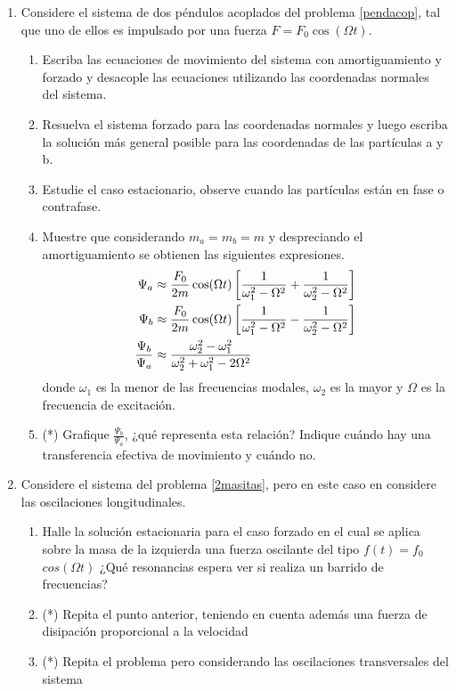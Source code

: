 \documentclass[11pt,spanish,a4paper]{article}
\begin{document}
\begin{enumerate}
\item Considere el sistema de dos péndulos acoplados del problema \ref{pendacop}, tal que uno de ellos es impulsado por una fuerza $F= F_0 \cos(\Omega t)$.  
\begin{enumerate}
	\item Escriba las ecuaciones de movimiento del sistema con amortiguamiento y forzado y desacople las ecuaciones utilizando las coordenadas normales del sistema.
	\item Resuelva el sistema forzado para las coordenadas normales y luego escriba la solución más general posible para las coordenadas de las partículas a y b.
	\item Estudie el caso estacionario, observe cuando las partículas están en fase o contrafase.
	\item Muestre que considerando $m_a= m_b= m$ y despreciando el amortiguamiento se obtienen las siguientes expresiones.
		\begin{align}
			\Psi_{a} &\approx \frac{F_{0}}{2m}\cos(\Omega t)\left[\frac{1}{\omega_{1}^{2}-\Omega^{2}} + \frac{1}{\omega_{2}^{2}-\Omega^{2}}\right] \notag \\
			\Psi_{b} &\approx \frac{F_{0}}{2m}\cos(\Omega t)\left[\frac{1}{\omega_{1}^{2}-\Omega^{2}} - \frac{1}{\omega_{2}^{2}-\Omega^{2}}\right] \notag \\
			\frac{\Psi_{b}}{\Psi_{a}} &\approx \frac{\omega_{2}^{2}-\omega_{1}^{2}}{\omega_{2}^{2}+\omega_{1}^{2}-2\Omega^{2}} \notag
		\end{align}
	donde $\omega_{1}$ es la menor de las frecuencias modales, $\omega_{2}$ es la mayor y $\Omega$ es la frecuencia de excitación.
	\item (*) Grafique $\frac{\Psi_{b}}{\Psi_{a}}$, ¿qué representa esta relación?
	Indique cuándo hay una transferencia efectiva de movimiento y cuándo no.
\end{enumerate}


\item Considere el sistema del problema \ref{2masitas}, pero en este caso en considere las oscilaciones longitudinales.
\begin{enumerate}
    \item Halle la solución estacionaria para el caso forzado en el cual se aplica sobre la masa de la izquierda una fuerza oscilante del tipo $f(t)=f_0$ $cos(\Omega t)$ ¿Qué resonancias espera ver si realiza un barrido de frecuencias?
		\item (*) Repita el punto anterior, teniendo en cuenta además una fuerza de disipación proporcional a la velocidad
		\item (*) Repita el problema pero considerando las oscilaciones transversales del sistema
\end{enumerate}



\end{enumerate}
\end{document}
